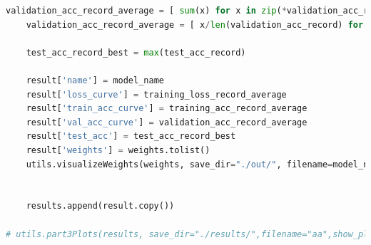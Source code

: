 \documentclass[3p,times,procedia]{elsarticle}
\begin{document}
\begin{lstlisting}[language=Python]
    validation_acc_record_average = [ sum(x) for x in zip(*validation_acc_record) ]
    validation_acc_record_average = [ x/len(validation_acc_record) for x in validation_acc_record_average ]

    test_acc_record_best = max(test_acc_record)

    result['name'] = model_name
    result['loss_curve'] = training_loss_record_average
    result['train_acc_curve'] = training_acc_record_average
    result['val_acc_curve'] = validation_acc_record_average
    result['test_acc'] = test_acc_record_best
    result['weights'] = weights.tolist()
    utils.visualizeWeights(weights, save_dir="./out/", filename=model_name+"_weights")


    results.append(result.copy())

# utils.part3Plots(results, save_dir="./results/",filename="aa",show_plot=True)


\end{lstlisting}
\end{document}
